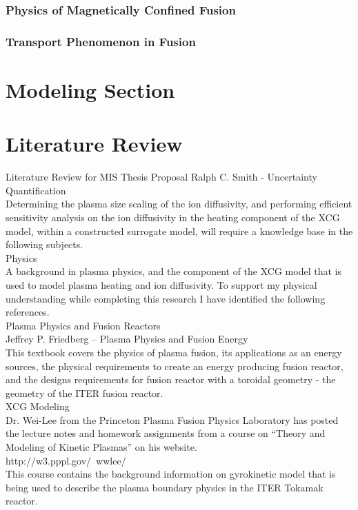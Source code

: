 \documentclass{article}
\begin{document}
\subsubsection{Physics of Magnetically Confined Fusion}
\subsubsection{Transport Phenomenon in Fusion}
\section{Modeling Section}
\section{Literature Review}
Literature Review for MIS Thesis Proposal
Ralph C. Smith - Uncertainty Quantification\\
Determining the plasma size scaling of the ion diffusivity, and performing efficient sensitivity analysis on the ion diffusivity in the heating component of the XCG model, within a constructed surrogate model, will require a knowledge base in the following subjects.\\  
Physics\\
A background in plasma physics, and the component of the XCG model that is used to model plasma heating and ion diffusivity. To support my physical understanding while completing this research I have identified the following references.\\
Plasma Physics and Fusion Reactors\\
Jeffrey P. Friedberg – Plasma Physics and Fusion Energy\\
This textbook covers the physics of plasma fusion, its applications as an energy sources, the physical requirements to create an energy producing fusion reactor, and the designs requirements for fusion reactor with a toroidal geometry - the geometry of the ITER fusion reactor.\\
XCG Modeling\\
Dr. Wei-Lee from the Princeton Plasma Fusion Physics Laboratory has posted the lecture notes and homework assignments from a course on “Theory and Modeling of Kinetic Plasmas” on his website.\\
http://w3.pppl.gov/~wwlee/\\
 This course contains the background information on gyrokinetic model that is being used to describe the plasma boundary physics in the ITER Tokamak reactor. \\
\end{document}
